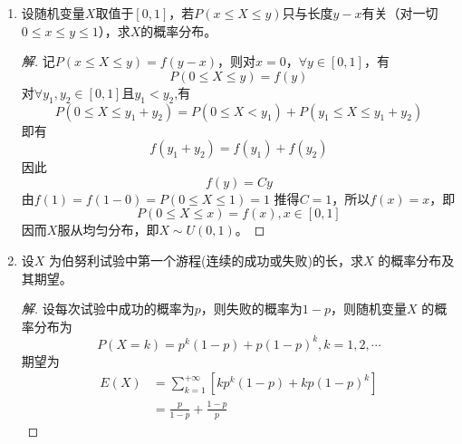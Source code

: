 \documentclass[12pt]{article}
\newcommand{\hei}{\CJKfamily{hei}}                          %
\begin{document}
\begin{enumerate}
\item {\hei 设随机变量$ X $取值于$ [0,1] $，若$ P\left( x \leq X \leq y\right)  $只与长度$ y-x $有关（对一切$ 0\leq x  \leq y\leq1 $），求$ X $的概率分布。}
\begin{proof}[解]
	记$ P\left( x\leq X \leq y\right)=f\left( y - x\right)   $，则对$ x = 0 $，$ \forall y\in \left[ 0,1 \right]  $，有
	\begin{equation}
		P\left( 0\leq X \leq y\right)=f\left( y\right) 
	\end{equation}
	对$ \forall {y_1},{y_2} \in \left[ 0,1 \right] $且$ {y_1}<{y_2}  $,有
	\begin{equation}
		P\left( 0\leq X \leq {y_1}+{y_2} \right)=P\left( 0\leq X < {y_1} \right)+P\left( {y_1} \leq X \leq {y_1}+{y_2} \right)
	\end{equation}
	即有
	\begin{equation}
		f \left(  {y_1}+{y_2}  \right)  = f \left(   {y_1} \right)  + f \left( {y_2} \right) 
	\end{equation}
	因此
	\begin{equation}
		f \left( {y} \right)  = C y
	\end{equation}
	由$ f \left( 1 \right)  =  f \left( 1-0 \right)  =  P\left( 0 \leq X \leq 1 \right) = 1 $ 推得$ C = 1 $，所以$ f \left( {x} \right)  = x $，即
	\begin{equation}
			P\left( 0 \leq X \leq x \right)=f \left( x \right) , x \in \left[ 0,1 \right]
	\end{equation}
	因而$ X $服从均匀分布，即$ X \sim U\left( 0,1 \right) $。
\end{proof}



\item {\hei 设$ X $ 为伯努利试验中第一个游程(连续的成功或失败)的长，求$ X $ 的概率分布及其期望。}
\begin{proof}[解]
	设每次试验中成功的概率为$ p $，则失败的概率为$ 1-p $，则随机变量$ X $ 的概率分布为
	\begin{equation}
		P \left(  X = k \right) = p^k \left(  1 - p \right) + p {\left(  1 - p \right)}^k , k = 1,2,\cdots
	\end{equation}
	期望为
	\begin{equation}
		\begin{aligned}
			E \left( X \right) & = \sum\limits_{k=1}^{+\infty }{\left[ k p^k \left(  1 - p \right) + kp {\left(  1 - p \right)}^k \right] }\\
			& = \frac{p}{1-p} + \frac{1-p}{p}
		\end{aligned}
	\end{equation}
\end{proof}



\end{enumerate}
\end{document}
